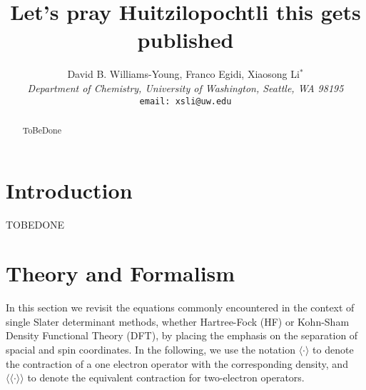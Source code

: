 \documentclass[12pt]{article}
\begin{document}
\title{Let's pray Huitzilopochtli this gets published}
\author{David B. Williams-Young, Franco Egidi, Xiaosong Li$^*$ \\[12pt]
\emph{Department of Chemistry, University of Washington, Seattle, WA 98195} \\[12pt]
\texttt{email: xsli@uw.edu}}
\maketitle

\begin{abstract}
ToBeDone
\end{abstract}

\pagebreak

\section{Introduction}
TOBEDONE

\section{Theory and Formalism}
In this section we revisit the equations commonly encountered in the context of single Slater determinant methods, whether Hartree-Fock (HF) or Kohn-Sham Density Functional Theory (DFT), by placing the emphasis on the separation of spacial and spin coordinates.
In the following, we use the notation $\langle\cdot\rangle$ to denote the contraction of a one electron operator with the corresponding density, and $\langle\langle\cdot\rangle\rangle$ to denote the equivalent contraction for two-electron operators.

\end{document}
